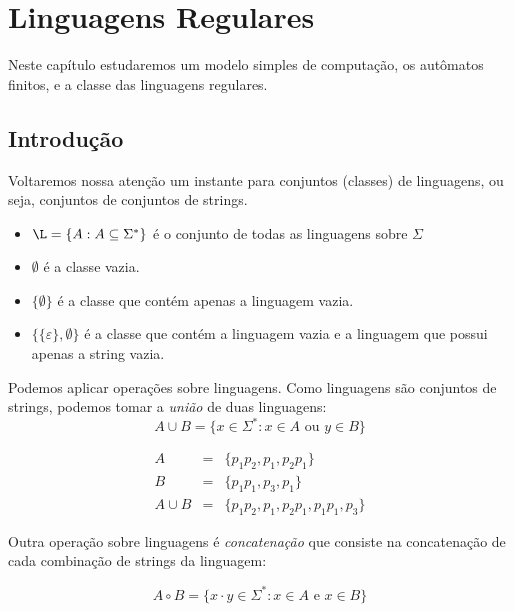 \chapter{Linguagens Regulares}
\label{cha:automatos}

Neste capítulo estudaremos um modelo simples de computação, os autômatos finitos, e a classe das linguagens regulares.

\section{Introdução}
\label{sec:linguagens-regulares}

Voltaremos nossa atenção um instante para conjuntos (classes) de linguagens, ou seja, conjuntos de conjuntos de strings.

\begin{example}
\begin{itemize}
\item[] $\L = \{A: A \subseteq \Sigma^*\}$ é o conjunto de todas as linguagens sobre $\Sigma$
\item[] $\emptyset$ é a classe vazia.
\item[] $\{\emptyset\}$ é a classe que contém apenas a linguagem vazia.
\item[] $\{\{\varepsilon\}, \emptyset\}$ é a classe que contém a linguagem vazia e a linguagem que possui apenas a string vazia.
\end{itemize}
\end{example}

Podemos aplicar operações sobre linguagens.
Como linguagens são conjuntos de strings, podemos tomar a {\em união} de duas linguagens:
\begin{displaymath}
  A \cup B = \{x \in \Sigma^* : x \in A \textrm{ ou } y \in B\}
\end{displaymath}


\begin{example}
  \begin{eqnarray*}
    A & = & \{p_1p_2, p_1, p_2p_1\}\\
    B & = & \{p_1p_1, p_3, p_1\}\\
    A \cup B & = & \{p_1p_2, p_1, p_2p_1, p_1p_1, p_3\}
  \end{eqnarray*}
\end{example}

Outra operação sobre linguagens é {\em concatenação} que consiste na concatenação de cada combinação de strings da linguagem:

\begin{displaymath}
  A \circ B = \{x \cdot y \in \Sigma^* : x \in A \textrm{ e } x \in B\}
\end{displaymath}

